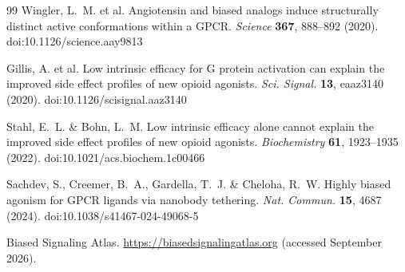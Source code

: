 ﻿\documentclass[11pt,a4paper]{article}
\begin{document}
\begin{thebibliography}{99}
Wingler, L.~M. et al. Angiotensin and biased analogs induce structurally distinct active conformations within a GPCR. \emph{Science} \textbf{367}, 888--892 (2020). doi:10.1126/science.aay9813

Gillis, A. et al. Low intrinsic efficacy for G protein activation can explain the improved side effect profiles of new opioid agonists. \emph{Sci. Signal.} \textbf{13}, eaaz3140 (2020). doi:10.1126/scisignal.aaz3140

Stahl, E.~L. \& Bohn, L.~M. Low intrinsic efficacy alone cannot explain the improved side effect profiles of new opioid agonists. \emph{Biochemistry} \textbf{61}, 1923--1935 (2022). doi:10.1021/acs.biochem.1c00466

Sachdev, S., Creemer, B.~A., Gardella, T.~J. \& Cheloha, R.~W. Highly biased agonism for GPCR ligands via nanobody tethering. \emph{Nat. Commun.} \textbf{15}, 4687 (2024). doi:10.1038/s41467-024-49068-5

Biased Signaling Atlas. \url{https://biasedsignalingatlas.org} (accessed September 2026).

\end{thebibliography}
\end{document}
